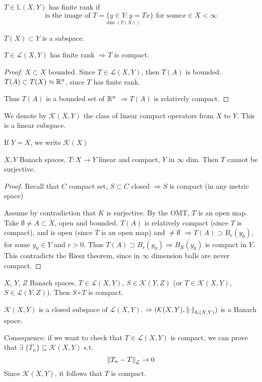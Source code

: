 \begin{definition}
    \(T \in \mathbb{L}(X, Y)\) has finite rank if 
    \[
        \underset{\dim (T(X))}{\text{is the image of }T= \{y \in Y: y = Tx\} \text{ for some} x \in X} < \infty
    \]
\end{definition}
\(T(X) \subset Y\) is a subspace.
\begin{proposition}
    \(T \in \mathcal{L}(X, Y)\) has finite rank \(\Rightarrow T\) is compact.
\end{proposition}
\begin{proof}
    \(X \subset X \) bounded. Since \(T \in \mathcal{L}(X, Y)\), then \(T(A)\) is bounded. \(T(A) \subset T(X) \approx \mathbb{R}^n\), since \(T\) has finite rank. 
    
    Thus \(T(A)\) is a bounded set of \(\mathbb{R}^n\) \(\Rightarrow T(A) \) is relatively compact. 
\end{proof}

\begin{definition}
    We denote by \(\mathcal{K}(X, Y)\) the class of linear compact operators from \(X \) to \(Y\). This is a linear subspace.

    If \(Y=X\), we write \(\mathcal{K}(X)\)
\end{definition}
\begin{proposition}
    \(X, Y\) Banach spaces, \(T:X \to Y\) linear and compact, \(Y\) in \(\infty\) dim. Then \(T\) cannot be surjective.
\end{proposition}
\begin{proof}
    Recall that \(C\) compact set, \(S \subset C\) closed \(\Rightarrow S\) is compact (in any metric space)

    Assume by contradiction that \(K\) is surjective. By the OMT, \(T\) is an open map. Take \(\emptyset \neq A \subset X\), open and bounded. \(T(A)\) is relatively compact (since \(T\) is compact), and is open (since \(T\) is an open map) and \(\neq \emptyset\)
    \(\Rightarrow T(A) \supset B_r(y_0)\), for some \(y_0 \in Y \) and \(r>0\). Thus \(\overline{T(A)} \supset \overline{B_r(y_0)} \Rightarrow \overline{B_R(y_0)} \) is compact in \(Y\). This contradicts the Riesz theorem, since in \(\infty\) dimension balls are never compact. 
\end{proof}

\begin{proposition}
    \(X\), \(Y\), \(Z\) Banach spaces. \(T \in \mathcal{L}(X, Y)\), \(S \in \mathcal{K}(Y, Z)\) (or \(T \in \mathcal{K}(X, Y)\), \(S \in \mathcal{L}(Y, Z)\)). Then \(S \circ T\) is compact.
\end{proposition}
\begin{theorem}
    \(\mathcal{K}(X, Y) \) is a closed subspace of \(\mathcal{L}(X, Y)\). \(\Rightarrow (\mathcal{K}(X, Y), \norm{\cdot}_{\mathcal{K}(X, Y)})\) is a Banach space.
\end{theorem}
Consequence: if we want to check that \(T \in \mathcal{L}(X, Y)\) is compact, we can prove that \(\exists\; \{T_n\} \subseteq \mathcal{K}(X, Y)\) s.t. 
\[
    \norm{T_n - T}_{\mathcal{L}} \to 0
\]
Since \(\mathcal{K}(X, Y)\), it follows that \(T\) is compact.